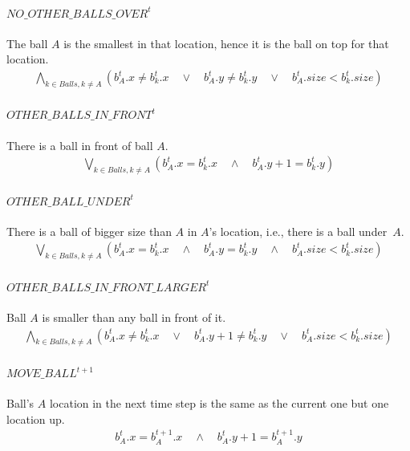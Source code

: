 \documentclass{report}
\theoremstyle{plain}
\begin{document}
\paragraph{$NO\_OTHER\_BALLS\_OVER^t$}
The ball $A$ is the smallest in that location, hence it is the ball on top for that location.
\begin{align*}
\bigwedge \limits_{k \in Balls, k \neq A} (b_A^t.x \neq b_k^t.x \quad \vee \quad b_A^t.y \neq b_k^t.y \quad \vee \quad b_A^t.size < b_k^t.size)
\end{align*}

\paragraph{$OTHER\_BALLS\_IN\_FRONT^t$}
There is a ball in front of ball $A$.
\begin{align*}
\bigvee \limits_{k \in Balls, k \neq A} (b_A^t.x = b_k^t.x \quad \wedge \quad b_A^t.y + 1 = b_k^t.y) 
\end{align*}

\paragraph{$OTHER\_BALL\_UNDER^t$}
There is a ball of bigger size than $A$ in $A$'s location, i.e., there is a ball under~$A$.
\begin{align*}
\bigvee \limits_{k \in Balls, k \neq A} (b_A^t.x = b_k^t.x \quad \wedge \quad b_A^t.y = b_k^t.y \quad \wedge \quad b_A^t.size < b_k^t.size) 
\end{align*}

\paragraph{$OTHER\_BALLS\_IN\_FRONT\_LARGER^t$}
Ball $A$ is smaller than any ball in front of it.
\begin{align*}
\bigwedge \limits_{k \in Balls, k \neq A} (b_A^t.x \neq b_k^t.x \quad \vee \quad b_A^t.y + 1 \neq b_k^t.y \quad \vee \quad b_A^t.size < b_k^t.size)
\end{align*}

\paragraph{$MOVE\_BALL^{t+1}$}
Ball's $A$ location in the next time step is the same as the current one but one location up. 
\begin{align*}
b_A^t.x = b_A^{t+1}.x \quad \wedge \quad b_A^t.y + 1 = b_A^{t+1}.y
\end{align*}
\end{document}
